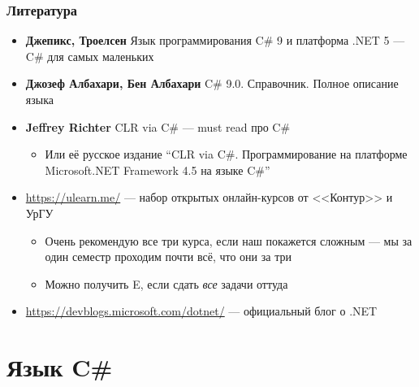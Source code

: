 \documentclass{../../slides-style}
\begin{document}
    \begin{frame}
    \frametitle{Литература}
        \begin{itemize}
            \item \textbf{Джепикс, Троелсен} Язык программирования C\# 9 и платформа .NET 5 --- C\# для самых маленьких
            \item \textbf{Джозеф Албахари, Бен Албахари} C\# 9.0. Справочник. Полное описание языка
            \item \textbf{Jeffrey Richter} CLR via C\# --- must read про C\#
            \begin{itemize}
                \item Или её русское издание ``CLR via C\#. Программирование на платформе Microsoft.NET Framework 4.5 на языке C\#''
            \end{itemize}
            \item \url{https://ulearn.me/} --- набор открытых онлайн-курсов от <<Контур>> и УрГУ
            \begin{itemize}
                \item Очень рекомендую все три курса, если наш покажется сложным --- мы за один семестр проходим почти всё, что они за три
                \item Можно получить E, если сдать \emph{все} задачи оттуда
            \end{itemize}
            \item \url{https://devblogs.microsoft.com/dotnet/} --- официальный блог о .NET
        \end{itemize}
    \end{frame}

    \section{Язык C\#}
\end{document}

